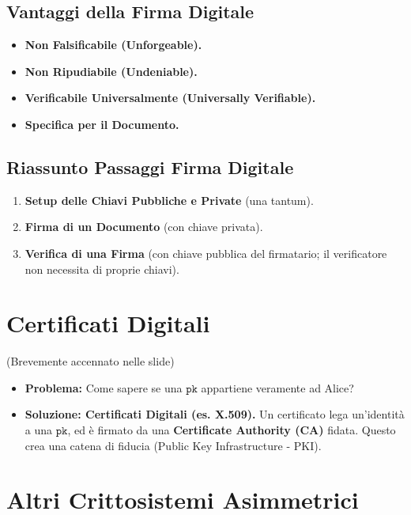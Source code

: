 \subsection{Vantaggi della Firma Digitale}
\begin{itemize}
    \item \textbf{Non Falsificabile (Unforgeable).}
    \item \textbf{Non Ripudiabile (Undeniable).}
    \item \textbf{Verificabile Universalmente (Universally Verifiable).}
    \item \textbf{Specifica per il Documento.}
\end{itemize}

\subsection{Riassunto Passaggi Firma Digitale}
\begin{enumerate}
    \item \textbf{Setup delle Chiavi Pubbliche e Private} (una tantum).
    \item \textbf{Firma di un Documento} (con chiave privata).
    \item \textbf{Verifica di una Firma} (con chiave pubblica del firmatario; il verificatore non necessita di proprie chiavi).
\end{enumerate}

\section{Certificati Digitali}
(Brevemente accennato nelle slide)
\begin{itemize}
    \item \textbf{Problema:} Come sapere se una $\texttt{pk}$ appartiene veramente ad Alice?
    \item \textbf{Soluzione: Certificati Digitali (es. X.509).}
    Un certificato lega un'identità a una $\texttt{pk}$, ed è firmato da una \textbf{Certificate Authority (CA)} fidata.
    Questo crea una catena di fiducia (Public Key Infrastructure - PKI).
\end{itemize}

\section{Altri Crittosistemi Asimmetrici}

